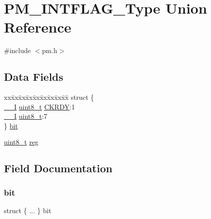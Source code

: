 \hypertarget{union_p_m___i_n_t_f_l_a_g___type}{}\section{P\+M\+\_\+\+I\+N\+T\+F\+L\+A\+G\+\_\+\+Type Union Reference}
\label{union_p_m___i_n_t_f_l_a_g___type}


{\ttfamily \#include $<$pm.\+h$>$}

\subsection*{Data Fields}
\begin{DoxyCompactItemize}
\item 
\begin{tabbing}
xx\=xx\=xx\=xx\=xx\=xx\=xx\=xx\=xx\=\kill
struct \{\\
\>\mbox{\hyperlink{core__cm0plus_8h_af63697ed9952cc71e1225efe205f6cd3}{\_\_I}} \mbox{\hyperlink{union_p_m___i_n_t_f_l_a_g___type_a5b4208c6f4c4a4290c4f2804d1eb1d5b}{uint8\_t}} \mbox{\hyperlink{union_p_m___i_n_t_f_l_a_g___type_a65802f74418a208c4e0d108d6e884c95}{CKRDY}}:1\\
\>\mbox{\hyperlink{core__cm0plus_8h_af63697ed9952cc71e1225efe205f6cd3}{\_\_I}} \mbox{\hyperlink{union_p_m___i_n_t_f_l_a_g___type_a5b4208c6f4c4a4290c4f2804d1eb1d5b}{uint8\_t}}:7\\
\} \mbox{\hyperlink{union_p_m___i_n_t_f_l_a_g___type_a3abbf74b2611ff3dbde7aed16634eced}{bit}}\\

\end{tabbing}\item 
\mbox{\hyperlink{union_p_m___i_n_t_f_l_a_g___type_a5b4208c6f4c4a4290c4f2804d1eb1d5b}{uint8\+\_\+t}} \mbox{\hyperlink{union_p_m___i_n_t_f_l_a_g___type_a9428adc9af4653a2050e2536b55dec8d}{reg}}
\end{DoxyCompactItemize}


\subsection{Field Documentation}
\mbox{\label{union_p_m___i_n_t_f_l_a_g___type_a3abbf74b2611ff3dbde7aed16634eced}} 
\subsubsection{\texorpdfstring{bit}{bit}}
{\footnotesize\ttfamily struct \{ ... \}   bit}


